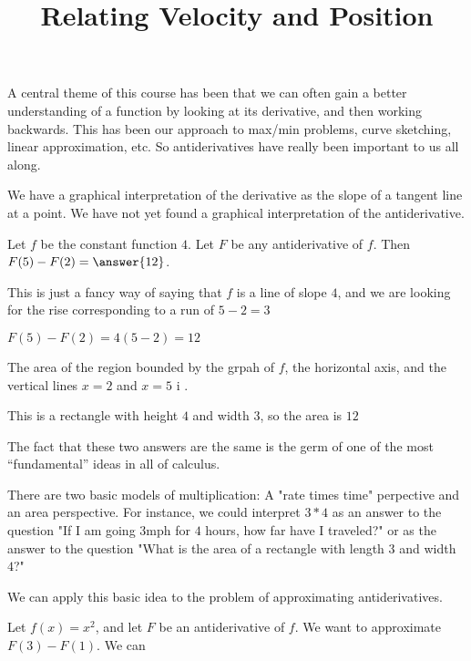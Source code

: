 \documentclass{ximera}
\title[Dig-In:]{Relating Velocity and Position}
\begin{document}
A central theme of this course has been that we can often gain a better understanding of a function by looking at its derivative, and then working backwards.  This has been our approach to max/min problems, curve sketching, linear approximation, etc.  So antiderivatives have really been important to us all along.

We have a graphical interpretation of the derivative as the slope of a tangent line at a point.  We have not yet found a graphical interpretation of the antiderivative.
\begin{question}
  \begin{question}
   Let $f$ be the constant function $4$. Let $F$ be any antiderivative of $f$.  Then $F(5)-F(2) = \answer{12}$.
   \begin{hint}
    This is just a fancy way of saying that $f$ is a line of slope $4$, and we are looking for the rise corresponding to a run of $5-2= 3$
   \end{hint}
   \begin{hint}
    $F(5) - F(2) = 4(5-2) = 12$
   \end{hint}
  \end{question}
  
  \begin{question}
    The area of the region bounded by the grpah of $f$, the horizontal axis, and the vertical lines $x=2$ and $x=5$ i .
    
    \begin{hint}
    \end{hint}
    \begin{hint}
      This is a rectangle with height $4$ and width $3$, so the area is $12$
    \end{hint}
  \end{question}
\end{question}

The fact that these two answers are the same is the germ of one of the most ``fundamental'' ideas in all of calculus.

\begin{idea}
  There are two basic models of multiplication:  A "rate times time" perpective and an area perspective.  For instance, we could interpret $3*4$ as an answer to the question "If I am going $3 \textrm{mph}$ for $4$ hours, how far have I traveled?" or as the answer to the question "What is the area of a rectangle with length $3$ and width $4$?"
\end{idea}

We can apply this basic idea to the problem of approximating antiderivatives.

\begin{example}
  Let $f(x) = x^2$, and let $F$ be an antiderivative of $f$.  We want to approximate $F(3) - F(1)$.  We can 
\end{example}
\end{document}
